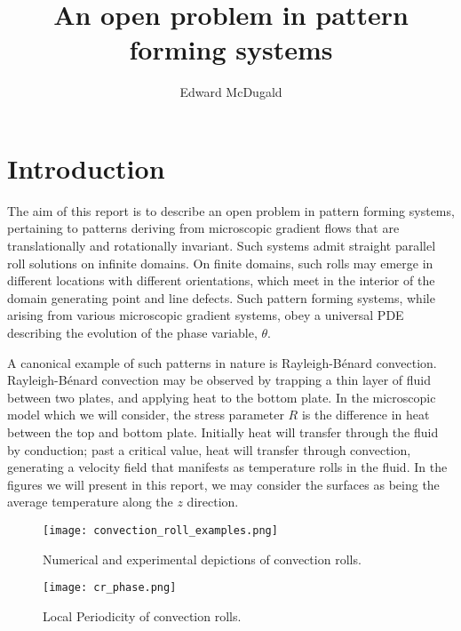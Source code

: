 \documentclass[12pt]{article}
\title{An open problem in pattern forming systems}
\author{Edward McDugald}
\numberwithin{equation}{section}
\begin{document}
\maketitle
\section{Introduction}
\par The aim of this report is to describe an open problem in pattern forming systems, pertaining to patterns deriving from microscopic gradient flows that are translationally and rotationally invariant. Such systems admit straight parallel roll solutions on infinite domains. On finite domains, such rolls may emerge in different locations with different orientations, which meet in the interior of the domain generating point and line defects. Such pattern forming systems, while arising from various microscopic gradient systems, obey a universal PDE describing the evolution of the phase variable, $\theta$. 
\par A canonical example of such patterns in nature is Rayleigh-B\'{e}nard convection. Rayleigh-B\'{e}nard convection may be observed by trapping a thin layer of fluid between two plates, and applying heat to the bottom plate. In the microscopic model which we will consider, the stress parameter $R$ is the difference in heat between the top and bottom plate. Initially heat will transfer through the fluid by conduction; past a critical value, heat will transfer through convection, generating a velocity field that manifests as temperature rolls in the fluid. In the figures we will present in this report, we may consider the surfaces as being the average temperature along the $z$ direction. 
\begin{figure}
\centering
\texttt{[image: convection\_roll\_examples.png]}
\caption{Numerical and experimental depictions of convection rolls.}
\end{figure}

\begin{figure}
\centering
\texttt{[image: cr\_phase.png]}
\caption{Local Periodicity of convection rolls.}
\end{figure}
\end{document}
